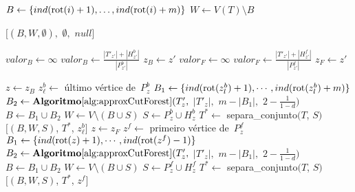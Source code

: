 	\begin{algorithm}[H]
	\label{alg:dobraDiametro}

		\caption{}
		{
			{
				$B\gets \{ind(\mathrm{rot}(i)+1),\ldots, ind(\mathrm{rot}(i)+m)\}$\;
				$W\gets V(T)\setminus B$\;

				\Return $[(B,W,\emptyset),$ $\emptyset,$ $null]$\;
			}
		}
		$valor_B \gets \infty$\;
		{
			{
			 	$valor_B \gets \frac{|T'_{z'}|+|H_{z'}^b|}{|P^b_{z'}|}$\;
			 	$z_B \gets z'$\; 
			}
		}
		$valor_F \gets \infty$\;
		{
			{
			 	$valor_F \gets \frac{|T'_{z'}|+|H_{z'}^f|}{|P^f_{z'}|}$\;
			 	$z_F \gets z'$\; 
			}
		}
	\end{algorithm}	

	\LinesNumberedHidden
	\begin{algorithm}[H]
	\Numberline
		{
			\Numberline$z\gets z_B$\;
			\Numberline$z^b_\ell \gets $ último vértice de~$P_z^b$\;
			\Numberline$B_1 \gets \{ind(\mathrm{rot}(z^b_l)+1),\cdots, ind(\mathrm{rot}(z^b_l)+m)\}$\;
			\Numberline$B_2 \gets \mathbf {Algoritmo\ref{alg:approxCutForest}}(T'_z,$ $|T'_z|,$ $m-|B_1|,$ $2-\frac{1}{1-d})$\;
			\Numberline$B \gets B_1\cup B_2$\;
			\Numberline$W \gets V\setminus (B\cup S)$\; 
			\Numberline$S \gets P_z^b\cup H^b_z $\;
			\Numberline$T^*\gets $ {\sc separa\_conjunto}$(T$, $S)$\;
			\Numberline\Return $[(B,W,S)$, $T^*$, $z^b_\ell]$\;
		}
		\Numberline
		\Else
		{
			\Numberline$z\gets z_F$\;
			\Numberline$z^f \gets $ primeiro vértice de~$P_z^f$\;
			\Numberline$B_1 \gets \{ind(\mathrm{rot}(z)+1),\cdots, ind(\mathrm{rot}(z^f)-1)\}$\;
			\Numberline$B_2 \gets \mathbf {Algoritmo\ref{alg:approxCutForest}}(T'_z,$ $|T'_z|,$ $m-|B_1|,$ $2-\frac{1}{1-d})$\;
			\Numberline$B \gets B_1\cup B_2$\;
			\Numberline$W \gets V\setminus (B\cup S)$\; 
			\Numberline$S \gets P_z^f\cup H^f_z $\;
			\Numberline$T^*\gets $ {\sc separa\_conjunto}$(T$, $S)$\;
			\Numberline\Return $[(B,W,S)$, $T^*$, $z^f]$\;		
		}
	\end{algorithm}	
	\LinesNumbered
	\bigskip
	\bigskip
